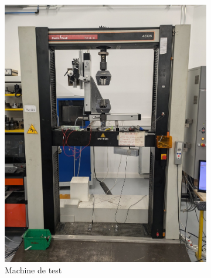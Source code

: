 \begin{figure}[h!]
\begin{subfigure}[t]{.4\textwidth}
        \includegraphics[width=\textwidth]{../ressources/images/retroline}
        \caption{Machine de test}
        \label{fig:machine}
    \end{subfigure}
    \caption{}
\end{figure}

